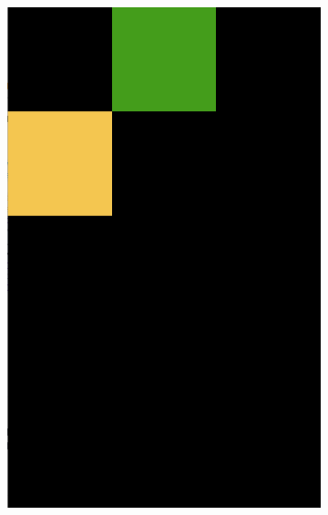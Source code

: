 \begin{figure}[ht]
\begin{subfigure}{0.15\textwidth}
    \end{subfigure}
    \hfill
    \begin{subfigure}{0.15\textwidth}
        \centering
        \includegraphics[width=\textwidth]{img/chap3/TestConflict1.png}
    \end{subfigure}
    \hfill
    \begin{subfigure}{0.15\textwidth}
        \centering

\end{subfigure}
\end{figure}
